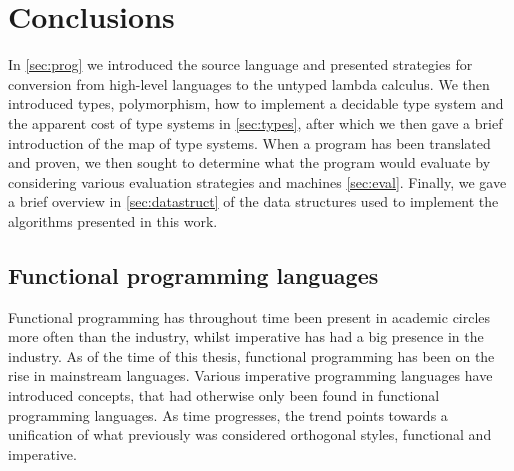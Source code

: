\chapter{Conclusions}
In \autoref{sec:prog} we introduced the source language and presented strategies for conversion from high-level languages to the untyped lambda calculus. 
We then introduced types, polymorphism, how to implement a decidable type system and the apparent cost of type systems in \autoref{sec:types}, after which we then gave a brief introduction of the map of type systems.
When a program has been translated and proven, we then sought to determine what the program would evaluate by considering various evaluation strategies and machines \autoref{sec:eval}.
Finally, we gave a brief overview in \autoref{sec:datastruct} of the data structures used to implement the algorithms presented in this work.

\section{Functional programming languages}
Functional programming has throughout time been present in academic circles more often than the industry, whilst imperative has had a big presence in the industry.
As of the time of this thesis, functional programming has been on the rise in mainstream languages.
Various imperative programming languages have introduced concepts, that had otherwise only been found in functional programming languages.
As time progresses, the trend points towards a unification of what previously was considered orthogonal styles, functional and imperative.

